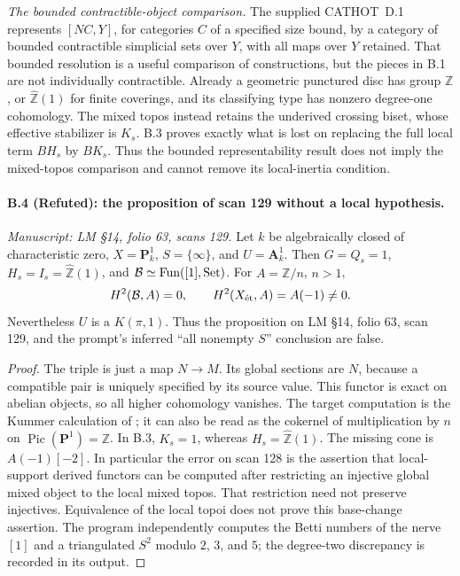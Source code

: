 \medskip
\noindent\emph{The bounded contractible-object comparison.}
The supplied CATHOT~D.1 represents $[NC,Y]$, for categories $C$
of a specified size bound, by a category of bounded contractible
simplicial sets over $Y$, with all maps over $Y$ retained. That
bounded resolution is a useful comparison of constructions, but
the pieces in B.1 are not individually contractible. Already a
geometric punctured disc has group $\mathbb Z$, or
$\widehat{\mathbb Z}(1)$ for finite coverings, and its classifying
type has nonzero degree-one cohomology. The mixed topos instead
retains the underived crossing biset, whose effective stabilizer is
$K_s$. B.3 proves exactly what is lost on replacing the full local
term $BH_s$ by $BK_s$. Thus the bounded representability result
does not imply the mixed-topos comparison and cannot remove its
local-inertia condition.

\paragraph{B.4 (Refuted): the proposition of scan 129 without a local hypothesis.}\label{B4}
\textit{Manuscript: LM \S14, folio 63, scans 129.}
Let $k$ be algebraically closed of characteristic zero,
$X=\mathbf P^1_k$, $S=\{\infty\}$, and $U=\mathbf A^1_k$.
Then $G=Q_s=1$, $H_s=I_s=\widehat{\mathbb Z}(1)$, and
$\mathcal B\simeq\operatorname{Fun}([1],\mathrm{Set})$. For
$A=\mathbb Z/n$, $n>1$,
\[
 H^2(\mathcal B,A)=0,\qquad
 H^2(X_{\mathrm{\acute et}},A)=A(-1)\ne0.
\]
Nevertheless $U$ is a $K(\pi,1)$. Thus the proposition on LM \S14,
folio 63, scan 129, and the prompt's inferred ``all nonempty $S$''
conclusion are false.

\begin{proof}
The triple is just a map $N\to M$. Its global sections are $N$,
because a compatible pair is uniquely specified by its source value.
This functor is exact on abelian objects, so all higher cohomology
vanishes. The target computation is the Kummer calculation of
\citep[Tag 03RQ, Lemma 59.69.1]{StacksCurveKummer}; it can also be read
as the cokernel of multiplication by $n$ on
$\operatorname{Pic}(\mathbf P^1)=\mathbb Z$.
In B.3, $K_s=1$, whereas $H_s=\widehat{\mathbb Z}(1)$.
The missing cone is $A(-1)[-2]$. In particular the error on scan 128
is the assertion that local-support derived functors can be computed
after restricting an injective global mixed object to the local mixed
topos. That restriction need not preserve injectives. Equivalence of
the local topoi does not prove this base-change assertion.
The program  independently computes the
Betti numbers of the nerve $[1]$ and a triangulated $S^2$ modulo
$2$, $3$, and $5$; the degree-two discrepancy is recorded in its output.
\end{proof}

